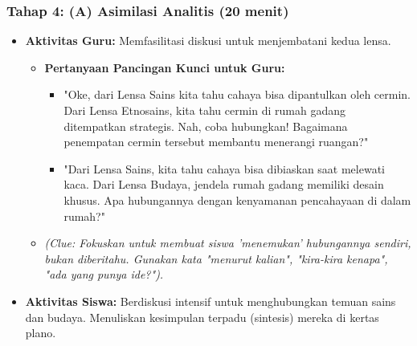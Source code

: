 \documentclass[12pt,a4paper]{article}
\begin{document}
\subsubsection{Tahap 4: (A) Asimilasi Analitis (20 menit)}
\begin{itemize}
\item \textbf{Aktivitas Guru:} Memfasilitasi diskusi untuk menjembatani kedua lensa.
    \begin{itemize}
    \item \textbf{Pertanyaan Pancingan Kunci untuk Guru:}
        \begin{itemize}
        \item "Oke, dari Lensa Sains kita tahu cahaya bisa dipantulkan oleh cermin. Dari Lensa Etnosains, kita tahu cermin di rumah gadang ditempatkan strategis. Nah, coba hubungkan! Bagaimana penempatan cermin tersebut membantu menerangi ruangan?"
        \item "Dari Lensa Sains, kita tahu cahaya bisa dibiaskan saat melewati kaca. Dari Lensa Budaya, jendela rumah gadang memiliki desain khusus. Apa hubungannya dengan kenyamanan pencahayaan di dalam rumah?"
        \end{itemize}
    \item \textit{(Clue: Fokuskan untuk membuat siswa 'menemukan' hubungannya sendiri, bukan diberitahu. Gunakan kata "menurut kalian", "kira-kira kenapa", "ada yang punya ide?").}
    \end{itemize}
\item \textbf{Aktivitas Siswa:} Berdiskusi intensif untuk menghubungkan temuan sains dan budaya. Menuliskan kesimpulan terpadu (sintesis) mereka di kertas plano.
\end{itemize}
\end{document}
